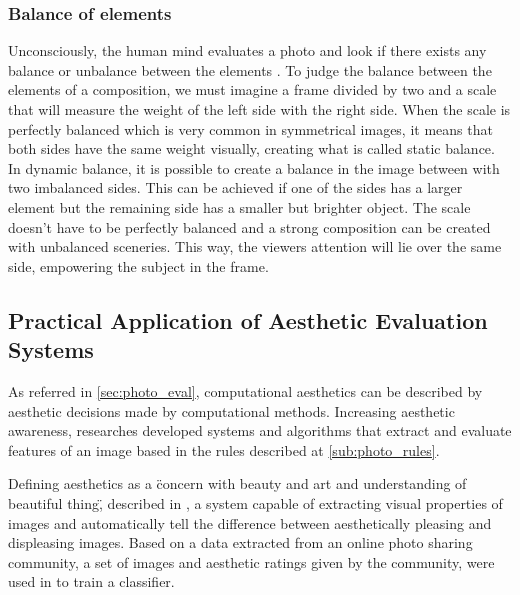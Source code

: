 \subsubsection{Balance of elements}
\label{subsub:balance_elements}

Unconsciously, the human mind evaluates a photo and look if there exists any balance or unbalance between the elements \cite{Santos}.
To judge the balance between the elements of a composition, we must imagine a frame divided by two and a scale that will measure the weight of the left side with the right side.
When the scale is perfectly balanced which is very common in symmetrical images, it means that both sides have the same weight visually, creating what is called static balance.
In dynamic balance, it is possible to create a balance in the image between with two imbalanced sides. This can be achieved if one of the sides has a larger element but the remaining side has a smaller but brighter object.
The scale doesn’t have to be perfectly balanced and a strong composition can be created with unbalanced sceneries. This way, the viewers attention will lie over the same side, empowering the subject in the frame.


\subsection{Practical Application of Aesthetic Evaluation Systems}
\label{subsub:eval_applications}


As referred in \ref{sec:photo_eval}, computational aesthetics can be described by aesthetic decisions made by computational methods. Increasing aesthetic awareness, researches developed systems and algorithms that extract and evaluate features of an image based  in the rules described at \ref{sub:photo_rules}.

Defining aesthetics as a \"concern with beauty and art and understanding of beautiful thing\", \citeauthor{Datta} described in \cite{Datta}, a system capable of extracting visual properties of images and automatically tell the difference between aesthetically pleasing and displeasing images. 
Based on a data extracted from an online photo sharing community, a set of images and aesthetic ratings given by the community, were used in to train a classifier.

